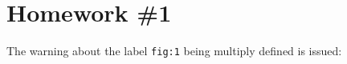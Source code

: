 \documentclass{article}
\begin{document}
\section{Homework \#1}
The warning about the label \verb|fig:1| being multiply defined is issued: 

\end{document}
